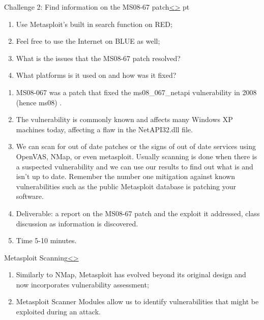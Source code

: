 \documentclass[12pt]{extarticle}
\newenvironment{instructionblock}{\Large\bgroup}{\egroup}
\begin{document}
\pagebreak

\begin{slide}{Challenge 2: Find information on the MS08-67 patch}{\hyperref[slide 9]{\textless}\hyperref[slide 11]{\textgreater}}
	 pt
	\begin{instructionblock}
		\begin{enumerate}
			\item Use Metasploit's built in search function on RED;
			\item Feel free to use the Internet on BLUE as well;
			\item What is the issues that the MS08-67 patch resolved?
			\item What platforms is it used on and how was it fixed?
		\end{enumerate}
	\end{instructionblock}
\end{slide}

\begin{enumerate}
	\item MS08-067 was a patch that fixed the ms08\_067\_netapi vulnerability in 2008 (hence ms08) \cite{b6}.
	\item The vulnerability is commonly known and affects many Windows XP machines today, affecting a flaw in the NetAPI32.dll file.
	\item We can scan for out of date patches or the signs of out of date services using OpenVAS, NMap, or even metasploit. Usually scanning is done when there is a suspected vulnerability and we can use our results to find out what is and isn't up to date. Remember the number one mitigation against known vulnerabilities such as the public Metasploit database is patching your software.
	\item Deliverable: a report on the MS08-67 patch and the exploit it addressed, class discussion as information is discovered.
	\item Time 5-10 minutes.
\end{enumerate}


\pagebreak
\begin{slide}{Metasploit Scanning\cite{b1}}{\hyperref[slide 10]{\textless}\hyperref[slide 12]{\textgreater}}
	\begin{instructionblock}
		\begin{enumerate} 
			\item Similarly to NMap, Metasploit has evolved beyond its original design and now incorporates vulnerability assessment;
			\item Metasploit Scanner Modules allow us to identify vulnerabilities that might be exploited during an attack. 
		\end{enumerate}
	\end{instructionblock}
\end{slide}
\end{document}
